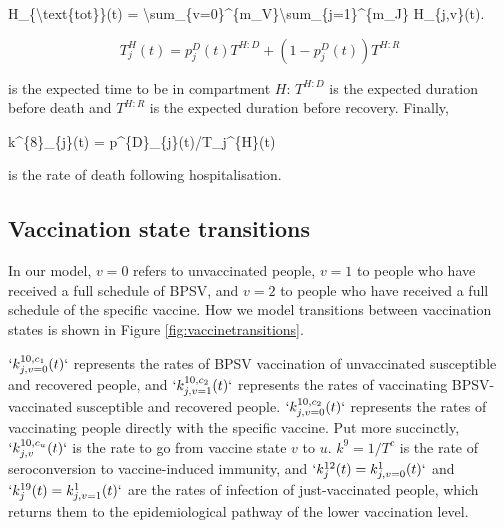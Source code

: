 \documentclass[
]{article}
\newenvironment{Shaded}{\begin{snugshade}}{\end{snugshade}}
\newcommand{\NormalTok}[1]{#1}
\begin{document}
\begin{Shaded}
\begin{Highlighting}[]
\NormalTok{H\_\{\textbackslash{}text\{tot\}\}(t) = \textbackslash{}sum\_\{v=0\}\^{}\{m\_V\}\textbackslash{}sum\_\{j=1\}\^{}\{m\_J\} H\_\{j,v\}(t).}
\end{Highlighting}
\end{Shaded}

\[T_j^{H}(t) = p_j^{D}(t)T^{H:D} + (1-p_{j}^{D}(t))T^{H:R}\]

is the expected time to be in compartment \(H\): \(T^{H:D}\) is the expected duration before death and \(T^{H:R}\) is the expected duration before recovery. Finally,

\begin{Shaded}
\begin{Highlighting}[]
\NormalTok{k\^{}\{8\}\_\{j\}(t) = p\^{}\{D\}\_\{j\}(t)/T\_j\^{}\{H\}(t)}
\end{Highlighting}
\end{Shaded}

is the rate of death following hospitalisation.

\subsection{Vaccination state transitions}\label{vaccination-state-transitions}

In our model, \(v=0\) refers to unvaccinated people, \(v=1\) to people who have received a full schedule of BPSV, and \(v=2\) to people who have received a full schedule of the specific vaccine. How we model transitions between vaccination states is shown in Figure \ref{fig:vaccinetransitions}.

\(`k^{10,c_1}_{j,v=0}(t)`\) represents the rates of BPSV vaccination of unvaccinated susceptible and recovered people, and \(`k^{10,c_2}_{j,v=1}(t)`\) represents the rates of vaccinating BPSV-vaccinated susceptible and recovered people. \(`k^{10,c_2}_{j,v=0}(t)`\) represents the rates of vaccinating people directly with the specific vaccine. Put more succinctly, \(`k^{10,c_u}_{j,v}(t)`\) is the rate to go from vaccine state \(v\) to \(u\). \(k^9=1/T^c\) is the rate of seroconversion to vaccine-induced immunity, and \(`k^{12}_{j}(t)=k^{1}_{j,v=0}(t)`\) and \(`k^{19}_{j}(t)=k^{1}_{j,v=1}(t)`\) are the rates of infection of just-vaccinated people, which returns them to the epidemiological pathway of the lower vaccination level.
\end{document}
